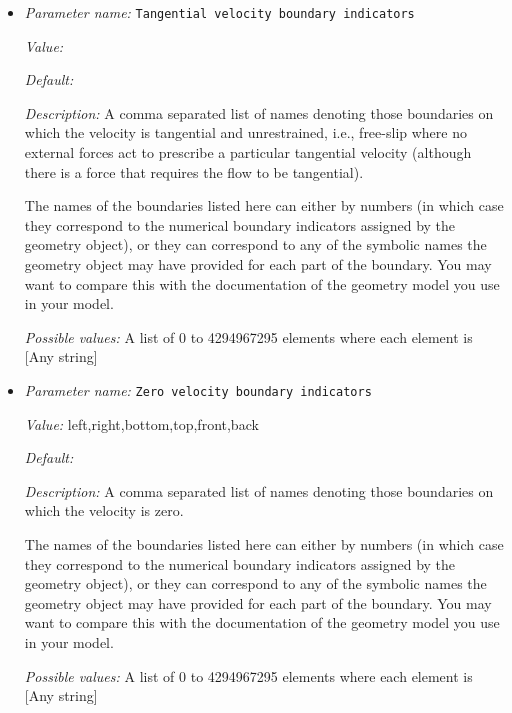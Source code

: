 \begin{itemize}
`zero velocity': Implementation of a model in which the boundary velocity is zero. This is commonly referred to as a ``stick boundary condition'', indicating that the material ``sticks'' to the material on the other side of the boundary.


{\it Possible values:} A key:value map of 0 to 4294967295 elements  where each key is [Any string] and each value is [Any one of ascii data, function, gplates, zero velocity]
\item {\it Parameter name:} {\tt Tangential velocity boundary indicators}
\label{parameters:Boundary velocity model/Tangential velocity boundary indicators}
\label{parameters:Boundary_20velocity_20model/Tangential_20velocity_20boundary_20indicators}


{\it Value:} 


{\it Default:} 


{\it Description:} A comma separated list of names denoting those boundaries on which the velocity is tangential and unrestrained, i.e., free-slip where no external forces act to prescribe a particular tangential velocity (although there is a force that requires the flow to be tangential).

The names of the boundaries listed here can either by numbers (in which case they correspond to the numerical boundary indicators assigned by the geometry object), or they can correspond to any of the symbolic names the geometry object may have provided for each part of the boundary. You may want to compare this with the documentation of the geometry model you use in your model.


{\it Possible values:} A list of 0 to 4294967295 elements where each element is [Any string]
\item {\it Parameter name:} {\tt Zero velocity boundary indicators}
\label{parameters:Boundary velocity model/Zero velocity boundary indicators}
\label{parameters:Boundary_20velocity_20model/Zero_20velocity_20boundary_20indicators}


{\it Value:} left,right,bottom,top,front,back


{\it Default:} 


{\it Description:} A comma separated list of names denoting those boundaries on which the velocity is zero.

The names of the boundaries listed here can either by numbers (in which case they correspond to the numerical boundary indicators assigned by the geometry object), or they can correspond to any of the symbolic names the geometry object may have provided for each part of the boundary. You may want to compare this with the documentation of the geometry model you use in your model.


{\it Possible values:} A list of 0 to 4294967295 elements where each element is [Any string]
\end{itemize}



